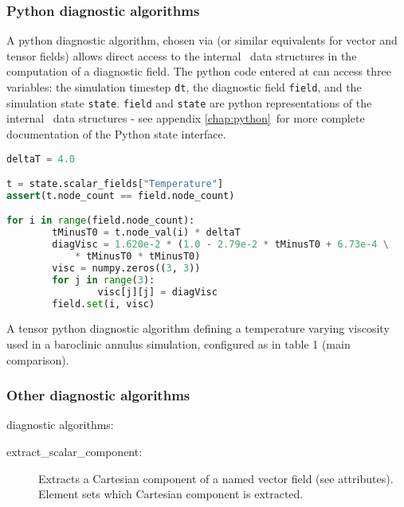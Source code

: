 \subsubsection{Python diagnostic algorithms}

A python diagnostic algorithm, chosen via 
(or similar equivalents for vector and tensor fields) allows direct access to the
internal \fluidity\ data structures in the computation of a diagnostic field. The
python code entered at 
can access three variables: the simulation timestep \lstinline[language = Python]*dt*,
the diagnostic field \lstinline[language = Python]*field*, and the simulation state
\lstinline[language = Python]*state*. \lstinline[language = Python]*field* and
\lstinline[language = Python]*state* are python representations of the internal
\fluidity\ data structures - see appendix \ref{chap:python}\ for more
complete documentation of the Python state interface.

\begin{example}
\begin{lstlisting}[language = Python]
deltaT = 4.0

t = state.scalar_fields["Temperature"]
assert(t.node_count == field.node_count)

for i in range(field.node_count):
        tMinusT0 = t.node_val(i) * deltaT
        diagVisc = 1.620e-2 * (1.0 - 2.79e-2 * tMinusT0 + 6.73e-4 \
            * tMinusT0 * tMinusT0)
        visc = numpy.zeros((3, 3))
        for j in range(3):
                visc[j][j] = diagVisc
        field.set(i, visc)
\end{lstlisting}
\caption{A tensor python diagnostic algorithm defining a temperature varying
         viscosity used in a baroclinic annulus simulation, configured
         as in \citet{hignett1985} table 1 (main comparison).}
\end{example}

\subsubsection{Other diagnostic algorithms}

 diagnostic algorithms:

\begin{description}
\item[extract\_scalar\_component:] Extracts a Cartesian component of a
  named vector field (see attributes). Element \option{component} sets 
  which Cartesian component is extracted.
\end{description}


